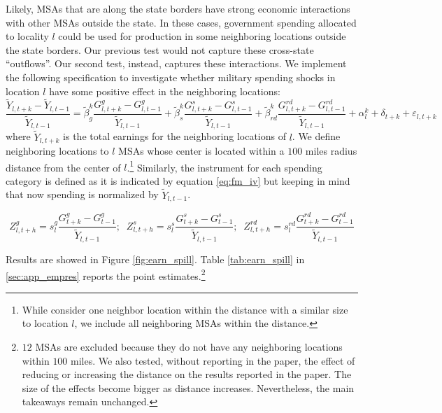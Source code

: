 \documentclass[dv_diss_main.tex]{subfiles}
\begin{document}
Likely, MSAs that are along the state borders have strong economic interactions with other MSAs outside the state. In these cases, government spending allocated to locality $l$ could be used for production in some neighboring locations outside the state borders. Our previous test would not capture these cross-state ``outflows''. Our second test, instead, captures these interactions. We implement the following specification to investigate whether military spending shocks in location $l$ have some positive effect in the neighboring locations:
\begin{equation}
    \frac{\tilde{Y}_{l,t+k} - \tilde{Y}_{l,t-1}}{\tilde{Y}_{l,t-1}} = \tilde{\beta}_{g}^k \frac{G^{g}_{l,t+k}-G^{g}_{l,t-1}}{\tilde{Y}_{l,t-1}} + \tilde{\beta}_{s}^k \frac{G^{s}_{l,t+k}-G^{s}_{l,t-1}}{\tilde{Y}_{l,t-1}} + \tilde{\beta}_{rd}^k \frac{G^{rd}_{l,t+k}-G^{rd}_{l,t-1}}{\tilde{Y}_{l,t-1}} + \alpha_l^k + \delta_{t+k} + \varepsilon_{l,t+k}
    \label{eq:fm_spill}
\end{equation}
where $\tilde{Y}_{l,t+k}$ is the total earnings for the neighboring locations of $l$. We define neighboring locations to $l$ MSAs whose center is located within a $100$ miles radius distance from the center of $l$.\footnote{While \cite{Auerbach2020} consider one neighbor location within the distance with a similar size to location $l$, we include all neighboring MSAs within the distance.} Similarly, the instrument for each spending category is defined as it is indicated by equation \ref{eq:fm_iv} but keeping in mind that now spending is normalized by $\tilde{Y}_{l,t-1}$.

\begin{equation}
    Z_{l,t+h}^g = s_{l}^g \frac{G^g_{t+k}-G^g_{t-1}}{\tilde{Y}_{l,t-1}};\;\;Z_{l,t+h}^s = s_{l}^s \frac{G^s_{t+k}-G^s_{t-1}}{\tilde{Y}_{l,t-1}};\;\;Z_{l,t+h}^{rd} = s_{l}^{rd} \frac{G^{rd}_{t+k}-G^{rd}_{t-1}}{\tilde{Y}_{l,t-1}}
    \label{eq:fm_iv2}
\end{equation}

\noindent Results are showed in Figure \ref{fig:earn_spill}. Table \ref{tab:earn_spill} in \ref{sec:app_empres} reports the point estimates.\footnote{$12$ MSAs are excluded because they do not have any neighboring locations within $100$ miles. We also tested, without reporting in the paper, the effect of reducing or increasing the distance on the results reported in the paper. The size of the effects become bigger as distance increases. Nevertheless, the main takeaways remain unchanged.}
\end{document}
